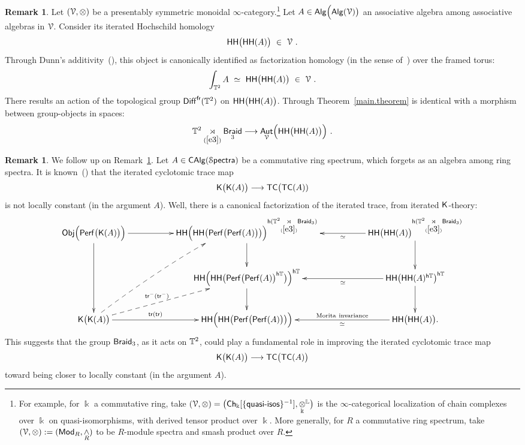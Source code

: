 \documentclass{amsart}
\theoremstyle{definition}
\newtheorem{remark}[theorem]{Remark}
\theoremstyle{remark}
\DeclareMathOperator{\Alg}{\sf Alg}
\DeclareMathOperator{\Mod}{\sf Mod}
\DeclareMathOperator{\CAlg}{\sf CAlg}
\DeclareMathOperator{\Aut}{\sf Aut}
\DeclareMathOperator{\Diff}{{\sf Diff}}
\DeclareMathOperator{\Spectra}{\cS\mathsf{pectra}}
\DeclareMathOperator{\fr}{\sf fr}
\def\ot{\otimes}
\DeclareMathOperator{\Braid}{\sf Braid}
\DeclareMathOperator{\sHH}{\sf HH}
\DeclareMathOperator{\Obj}{\sf Obj}
\DeclareMathOperator{\Perf}{\sf Perf}
\begin{document}
\begin{remark}\label{r3}
Let $(\cV,\ot)$ be a presentably symmetric monoidal $\infty$-category.\footnote{
For example, for $\Bbbk$ a commutative ring, take $(\cV,\ot) = \bigl({\sf Ch}_\Bbbk[\{{\sf quasi\text{-}isos}\}^{-1}],\underset{\Bbbk}\otimes^{\LL}\bigr)$ is the $\infty$-categorical localization of chain complexes over $\Bbbk$ on quasi-isomorphisms, with derived tensor product over $\Bbbk$.
More generally, for $R$ a commutative ring spectrum, take $(\cV,\ot) := (\Mod_R,\underset{R}\wedge)$ to be $R$-module spectra and smash product over $R$.
}
Let $A \in \Alg\Bigl( \Alg(\cV) \bigr)$ an associative algebra among associative algebras in $\mathcal V$.
Consider its iterated Hochschild homology
\[
\sHH\bigl( \sHH( A ) \bigr)
~\in~
\cV
~.
\]
Through Dunn's additivity~(\cite{dunn??}), this object is canonically identified as factorization homology (in the sense of~\cite{old.fact}) over the framed torus:
\[
\int_{\TT^2} A
~\simeq~
\sHH\bigl( \sHH( A ) \bigr)
~\in~
\cV
~.
\]
There results an action of the topological group $\Diff^{\fr}(\TT^2)$ on $\sHH\bigl( \sHH( A ) \bigr)$.
Through Theorem~\ref{main.theorem} is identical with a morphism between group-objects in spaces:
\[
\TT^2 \underset{(\ref{e3})}\rtimes \Braid_3
\longrightarrow
\Aut_\cV\Bigl( 
\sHH\bigl( \sHH( A ) \bigr)
\Bigr)
~.
\]
\end{remark}




\begin{remark}\label{r4}
We follow up on Remark~\ref{r3}.
Let $A \in \CAlg(\Spectra)$ be a commutative ring spectrum, which forgets as an algebra among ring spectra.  
It is known~(\cite{??}) that the iterated cyclotomic trace map
\[
\mathsf K\bigl( \mathsf K( A ) \bigr) 
\longrightarrow
{\sf TC}\bigl( {\sf TC}( A ) )
\]
is not locally constant (in the argument $A$).  
Well, there is a canonical factorization of the iterated trace, from iterated $\mathsf K$-theory:
\[
\xymatrix{
\Obj\Bigl( \Perf\bigl( \sK(A) \bigr) \Bigr) \ar[rr] \ar[dd]
&&
\sHH\Bigl( \sHH\bigl( \Perf\bigl( \Perf(A) \bigr) \bigr) \Bigr)^{{\sf h} ( \TT^2 \underset{(\ref{e3})}\rtimes \Braid_3) }  \ar[d]
&&
\sHH\bigl( \sHH( A ) \bigr)^{{\sf h} ( \TT^2 \underset{(\ref{e3})}\rtimes \Braid_3) } \ar[d] \ar[ll]^-{\simeq}
\\
&&
\sHH\Bigl( \sHH\bigl( \Perf\bigl( \Perf(A) \bigr)^{{\sf h} \TT}  \bigr) \Bigr)^{{\sf h} \TT}  \ar[d]
&&
\sHH\bigl( \sHH( A )^{{\sf h} \TT} \bigr)^{{\sf h} \TT} \ar[d] \ar[ll]^-{\simeq}
\\
\sK\bigl( \sK( A ) \bigr) \ar[rr]^-{{\sf tr}({\sf tr})}
\ar@{-->}[urr]^-{{\sf tr}^-({\sf tr}^-)}
\ar@(-,u)@{-->}[uurr]
&&
\sHH\Bigl( \sHH\bigl( \Perf\bigl( \Perf(A) \bigr) \bigr) \Bigr)
&&
\sHH\bigl( \sHH( A ) \bigr) \ar[ll]^-{\simeq}_-{\rm Morita~invariance}
.
}
\]
This suggests that the group $\Braid_3$, as it acts on $\mathbb T^2$, could play a fundamental role in improving the iterated cyclotomic trace map
\[
\mathsf K\bigl( \mathsf K( A ) \bigr) 
\longrightarrow
{\sf TC}\bigl( {\sf TC}( A ) \bigr)
\]
toward being closer to locally constant (in the argument $A$).
\end{remark}
\end{document}
